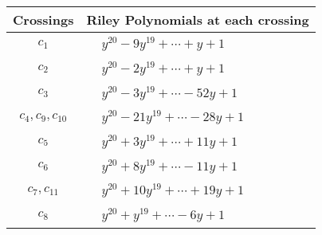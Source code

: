 \documentclass[1p]{elsarticle_modified}
\theoremstyle{definition}
\begin{document}
\begin{tabular}{m{50pt}|m{274pt}}
Crossings & \hspace{64pt}Riley Polynomials at each crossing \\
\hline $$\begin{aligned}c_{1}\end{aligned}$$&$\begin{aligned}
&y^{20}-9 y^{19}+\cdots+y+1
\end{aligned}$\\
\hline $$\begin{aligned}c_{2}\end{aligned}$$&$\begin{aligned}
&y^{20}-2 y^{19}+\cdots+y+1
\end{aligned}$\\
\hline $$\begin{aligned}c_{3}\end{aligned}$$&$\begin{aligned}
&y^{20}-3 y^{19}+\cdots-52 y+1
\end{aligned}$\\
\hline $$\begin{aligned}c_{4},c_{9},c_{10}\end{aligned}$$&$\begin{aligned}
&y^{20}-21 y^{19}+\cdots-28 y+1
\end{aligned}$\\
\hline $$\begin{aligned}c_{5}\end{aligned}$$&$\begin{aligned}
&y^{20}+3 y^{19}+\cdots+11 y+1
\end{aligned}$\\
\hline $$\begin{aligned}c_{6}\end{aligned}$$&$\begin{aligned}
&y^{20}+8 y^{19}+\cdots-11 y+1
\end{aligned}$\\
\hline $$\begin{aligned}c_{7},c_{11}\end{aligned}$$&$\begin{aligned}
&y^{20}+10 y^{19}+\cdots+19 y+1
\end{aligned}$\\
\hline $$\begin{aligned}c_{8}\end{aligned}$$&$\begin{aligned}
&y^{20}+y^{19}+\cdots-6 y+1
\end{aligned}$\\
\hline
\end{tabular}\\~\\
\end{document}

